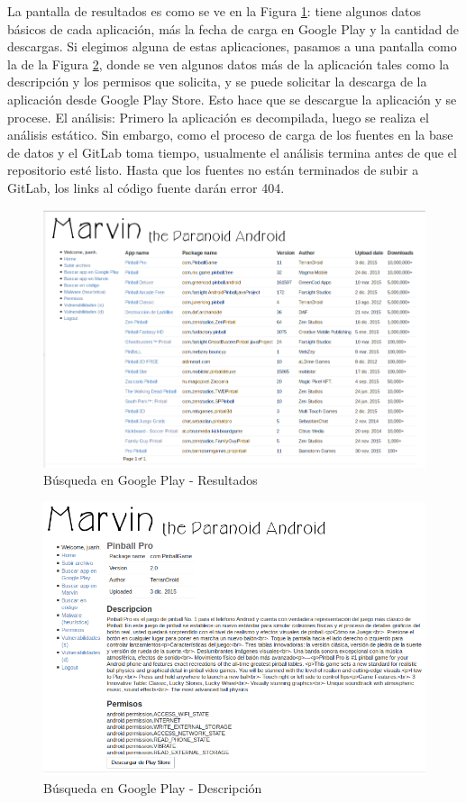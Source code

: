 \documentclass[11pt]{article}
\begin{document}
La pantalla de resultados es como se ve en la Figura \ref{gplay2}: tiene algunos datos básicos de cada aplicación, más la fecha de carga en Google Play y la cantidad de descargas. Si elegimos alguna de estas aplicaciones, pasamos a una pantalla como la de la Figura \ref{gplay3}, donde se ven algunos datos más de la aplicación tales como la descripción y los permisos que solicita, y se puede solicitar la descarga de la aplicación desde Google Play Store. Esto hace que se descargue la aplicación y se procese.
El análisis: Primero la aplicación es decompilada, luego se realiza el análisis estático. Sin embargo, como el proceso de carga de los fuentes en la base de datos y el GitLab toma tiempo, usualmente el análisis termina antes de que el repositorio esté listo. Hasta que los fuentes no están terminados de subir a GitLab, los links al código fuente darán error 404.

\begin{figure}[H]
\begin{center}
\includegraphics[width=.8\textwidth]{graphics/marvin_gplay2.png}
\caption{Búsqueda en Google Play - Resultados} \label{gplay2}
\end{center}
\end{figure}

\begin{figure}[H]
\begin{center}
\includegraphics[width=.8\textwidth]{graphics/marvin_gplay3.png}
\caption{Búsqueda en Google Play - Descripción} \label{gplay3}
\end{center}
\end{figure}
\end{document}
